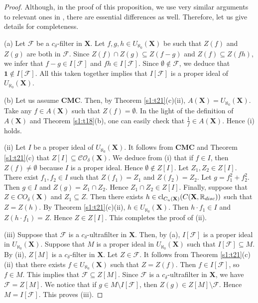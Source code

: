 \documentclass[12pt,twoside,leqno]{article}
\theoremstyle{plain}
\theoremstyle{definition}
\theoremstyle{remark}
\DeclareMathOperator{\cl}{{\rm cl}}
\begin{document}
\begin{proof}
	Although, in the proof of this proposition, we use very similar arguments to relevant ones in \cite[Chapter 2]{gj}, there are essential differences as well. Therefore, let us give details for completeness.
	
	(a) Let $\mathcal{F}$ be a $c_{\delta}$-filter in $\mathbf{X}$. Let $f,g, h \in U_{\aleph_0}(\mathbf{X})$ be such that $Z(f)$ and $Z(g)$ are both in $\mathcal{F}$. Since $Z(f)\cap Z(g)\subseteq Z(f-g)$ and $Z(f)\subseteq Z(fh)$, we infer that $f-g\in I[\mathcal{F}]$ and $fh\in I[\mathcal{F}]$. Since $\emptyset\notin\mathcal{F}$, we deduce that $\mathbf{1}\notin I[\mathcal{F}]$. All this taken together implies that $I[\mathcal{F}]$ is a proper ideal of $U_{\aleph_0}(\mathbf{X})$. \medskip
	
	(b) Let us assume $\mathbf{CMC}$. Then, by Theorem \ref{s1:t21}(c)(ii), $A(\mathbf{X})=U_{\aleph_0}(\mathbf{X})$. Take any $f\in A(\mathbf{X})$ such that $Z(f)=\emptyset$. In the light of the definition of $A(\mathbf{X})$ and Theorem \ref{s1:t18}(b), one can easily check that $\frac{1}{f}\in A(\mathbf{X})$. Hence (i) holds.
	
	(ii) Let $I$ be a proper ideal of $U_{\aleph_0}(\mathbf{X})$. It follows from $\mathbf{CMC}$ and Theorem \ref{s1:t21}(c) that $Z[I]\subseteq\mathcal{CO}_{\delta}(\mathbf{X})$. We deduce from (i) that if $f\in I$, then $Z(f)\neq\emptyset$ because $I$ is a proper ideal. Hence $\emptyset\notin Z[I]$.  Let $Z_1,Z_2\in Z[I]$. There exist $f_1,f_2\in I$ such that $Z(f_1)=Z_1$ and $Z(f_2)=Z_2$. Let $g= f_1^2+f_2^2$. Then $g\in I$ and $Z(g)=Z_1\cap Z_2$. Hence $Z_1\cap Z_2\in Z[I]$. Finally, suppose that $Z\in CO_{\delta}(\mathbf{X})$ and $Z_1\subseteq Z$. Then there exists $h\in \cl_{C_{u}(\mathbf{X})}(C(\mathbf{X}, \mathbb{R}_{disc}))$ such that $Z=Z(h)$. By Theorem \ref{s1:t21}(c)(ii), $h\in U_{\aleph_0}(\mathbf{X})$. 
	Then $h\cdot f_1\in I$ and $Z(h\cdot f_1)= Z$. Hence $Z\in Z[I]$. This completes the proof of (ii).
	
	(iii) Suppose that $\mathcal{F}$ is a $c_{\delta}$-ultrafilter in $\mathbf{X}$. Then, by (a), $I[\mathcal{F}]$ is a proper ideal in $U_{\aleph_0}(\mathbf{X})$. Suppose that $M$ is a proper ideal in $U_{\aleph_0}(\mathbf{X})$ such that $I[\mathcal{F}]\subseteq M$. By (ii), $Z[M]$ is a $c_{\delta}$-filter in $\mathbf{X}$. Let $Z\in\mathcal{F}$. It follows from Theorem \ref{s1:t21}(c)(ii) that there exists $f\in U_{\aleph_0}(\mathbf{X})$ such that $Z=Z(f)$. Then $f\in I[\mathcal{F}]$, so $f\in M$. This implies that $\mathcal{F}\subseteq Z[M]$. Since $\mathcal{F}$ is a $c_{\delta}$-ultrafilter in $\mathbf{X}$, we have $\mathcal{F}= Z[M]$. We notice that if $g\in M\setminus I[\mathcal{F}]$, then $Z(g)\in Z[M]\setminus \mathcal{F}$. Hence $M=I[\mathcal{F}]$. This proves (iii).
	

\end{proof}
\end{document}
